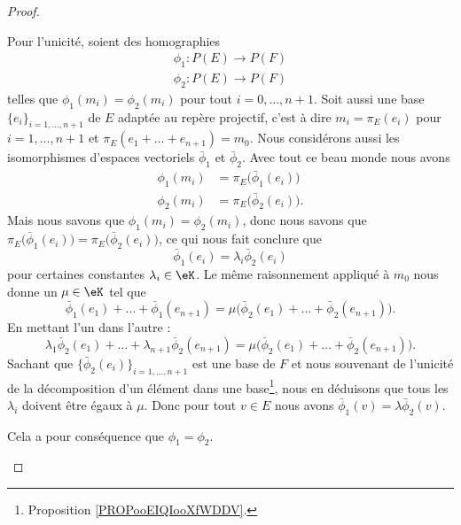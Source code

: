 \begin{proof}
\begin{subproof}
            Pour l'unicité, soient des homographies
            \begin{subequations}
                \begin{align}
                    \phi_1\colon P(E)\to P(F)\\
                    \phi_2\colon P(E)\to P(F)
                \end{align}
            \end{subequations}
            telles que \( \phi_1(m_i)=\phi_2(m_i)\) pour tout \( i=0,\ldots, n+1\). Soit aussi une base \( \{ e_i \}_{i=1,\ldots, n+1}\) de \( E\) adaptée au repère projectif, c'est à dire \( m_i=\pi_E(e_i)\) pour \( i=1,\ldots, n+1\) et \( \pi_E(e_1+\ldots +e_{n+1})=m_0\). Nous considérons aussi les isomorphismes d'espaces vectoriels \( \bar\phi_1\) et \( \bar\phi_2\). Avec tout ce beau monde nous avons
            \begin{subequations}
                \begin{align}
                    \phi_1(m_i)&=\pi_E\big( \bar\phi_1(e_i) \big)\\
                    \phi_2(m_i)&=\pi_E\big( \bar\phi_2(e_i) \big).
                \end{align}
            \end{subequations}
            Mais nous savons que \( \phi_1(m_i)=\phi_2(m_i)\), donc nous savons que \( \pi_E\big( \bar\phi_1(e_i) \big)=\pi_E\big( \bar\phi_2(e_i) \big)\), ce qui nous fait conclure que
            \begin{equation}
                \bar\phi_1(e_i)=\lambda_i\bar\phi_2(e_i)
            \end{equation}
            pour certaines constantes \( \lambda_i\in \eK\). Le même raisonnement appliqué à \( m_0\) nous donne un \( \mu\in \eK\) tel que
            \begin{equation}
                \bar\phi_1(e_1)+\ldots +\bar\phi_1(e_{n+1})=\mu\big( \bar\phi_2(e_1)+\ldots +\bar\phi_2(e_{n+1}) \big).
            \end{equation}
            En mettant l'un dans l'autre :
            \begin{equation}
                \lambda_1\bar\phi_2(e_1)+\ldots +\lambda_{n+1}\bar\phi_2(e_{n+1})=\mu\big( \bar\phi_2(e_1)+\ldots +\bar\phi_2(e_{n+1}) \big).
            \end{equation}
            Sachant que \( \{ \bar\phi_2(e_i) \}_{i=1,\ldots, n+1}\) est une base de \( F\) et nous souvenant de l'unicité de la décomposition d'un élément dans une base\footnote{Proposition \ref{PROPooEIQIooXfWDDV}.}, nous en déduisons que tous les \( \lambda_i\) doivent être égaux à \( \mu\). Donc pour tout \( v\in E\) nous avons \( \bar\phi_1(v)=\lambda\bar\phi_2(v)\).

            Cela a pour conséquence que \( \phi_1=\phi_2\).
    \end{subproof}
\end{proof}


